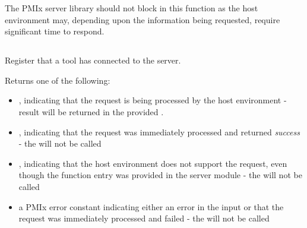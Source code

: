 \adviceimplstart
The \ac{PMIx} server library should not block in this function as the host environment may, depending upon the information being requested, require significant time to respond.
\adviceimplend


\subsection{}

\summary

Register that a tool has connected to the server.

\format


\begin{arglist}
\end{arglist}

Returns one of the following:

\begin{itemize}
    \item {}, indicating that the request is being processed by the host environment - result will be returned in the provided .
    \item {}, indicating that the request was immediately processed and returned \textit{success} - the  will not be called
    \item {}, indicating that the host environment does not support the request, even though the function entry was provided in the server module - the  will not be called
    \item a PMIx error constant indicating either an error in the input or that the request was immediately processed and failed - the  will not be called
\end{itemize}

